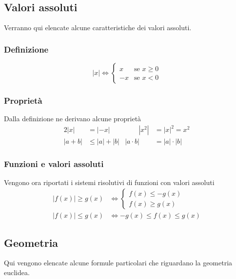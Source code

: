 \subsection{Valori assoluti}
Verranno qui elencate alcune caratteristiche dei valori assoluti.

\subsubsection{Definizione}
\begin{equation*}
\left\lvert x\right\rvert \Leftrightarrow
\begin{cases}
x &\text{se } x \geq 0\\
-x &\text{se } x < 0
\end{cases}
\end{equation*}

\subsubsection{Proprietà}
Dalla definizione ne derivano alcune proprietà
\begin{alignat*}{2}
\left\lvert x\right\rvert &= \left\lvert -x\right\rvert &\qquad 
\left\lvert x^2\right\rvert&=\left\lvert x\right\rvert^2 = x^2\\
\left\lvert a+b\right\rvert &\leq \left\lvert a\right\rvert+\left\lvert b\right\rvert & 
\left\lvert a\cdot b\right\rvert&=\left\lvert a\right\rvert\cdot\left\lvert b\right\rvert
\end{alignat*}

\subsubsection{Funzioni e valori assoluti}
Vengono ora riportati i sistemi risolutivi di funzioni con valori assoluti
\begin{align*}
\left\lvert f(x)\right\rvert \geq g(x) &\Leftrightarrow 
\begin{cases}
f(x) \leq -g(x)\\
f(x) \geq g(x)
\end{cases}\\
\left\lvert f(x)\right\rvert \leq g(x) &\Leftrightarrow -g(x)\leq f(x) \leq g(x)
\end{align*}

\subsection{Geometria}
Qui vengono elencate alcune formule particolari che riguardano la geometria euclidea.

